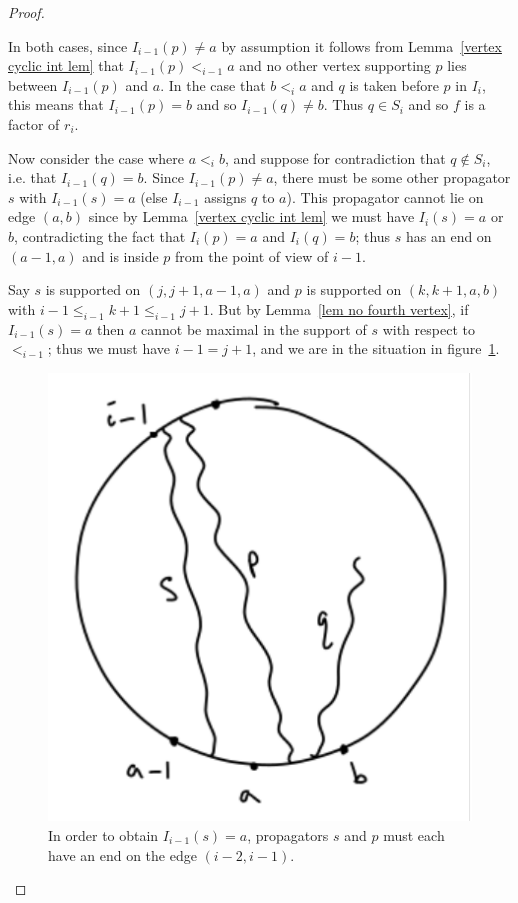 \documentclass[11pt]{article}
\theoremstyle{remark}
\theoremstyle{definition}
\begin{document}
\begin{proof}
\begin{enumerate}
In both cases, since $I_{i-1}(p)\neq a$ by assumption it follows from Lemma~\ref{vertex cyclic int lem} that $I_{i-1}(p) <_{i-1} a$ and no other vertex supporting $p$ lies between $I_{i-1}(p)$ and $a$. In the case that $b<_i a$ and $q$ is taken before $p$ in $I_i$, this means that $I_{i-1}(p)=b$ and so $I_{i-1}(q)\neq b$.  Thus $q\in S_i$ and so $f$ is a factor of $r_i$.

Now consider the case where $a<_i b$, and suppose for contradiction that $q \not\in S_i$, i.e. that $I_{i-1}(q) = b$. Since $I_{i-1}(p) \neq a$, there must be some other propagator $s$ with $I_{i-1}(s) = a$ (else $I_{i-1}$ assigns $q$ to $a$). This propagator cannot lie on edge $(a,b)$ since by Lemma~\ref{vertex cyclic int lem} we must have $I_i(s) = a$ or $b$, contradicting the fact that $I_i(p) = a$ and $I_i(q) = b$; thus $s$ has an end on $(a-1,a)$ and is inside $p$ from the point of view of $i-1$.

Say $s$ is supported on $(j, j+1, a-1, a)$ and $p$ is supported on $(k, k+1, a, b)$ with $i-1 \leq_{i-1} k+1 \leq_{i-1} j+1$. But by Lemma~\ref{lem no fourth vertex}, if $I_{i-1}(s) = a$ then $a$ cannot be maximal in the support of $s$ with respect to $<_{i-1}$; thus we must have $i-1 = j+1$, and we are in the situation in figure~\ref{fig part 4}.

\begin{figure}
  \includegraphics[scale=0.5]{part4}
  \caption{In order to obtain $I_{i-1}(s) = a$, propagators $s$ and $p$ must each have an end on the edge $(i-2,i-1)$.}\label{fig part 4}
\end{figure}


\end{enumerate}
\end{proof}
\end{document}

